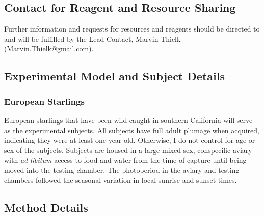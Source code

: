 \subsection{Contact for Reagent and Resource Sharing}
Further information and requests for resources and reagents should be directed to and will be fulfilled by the Lead Contact, Marvin Thielk (Marvin.Thielk@gmail.com).

\subsection{Experimental Model and Subject Details}
\subsubsection{European Starlings}
European starlings that have been wild-caught in southern California will serve as the experimental subjects. All subjects have full adult plumage when acquired, indicating they were at least one year old. Otherwise, I do not control for age or sex of the subjects. Subjects are housed in a large mixed sex, conspecific aviary with \textit{ad libitum} access to food and water from the time of capture until being moved into the testing chamber. The photoperiod in the aviary and testing chambers followed the seasonal variation in local sunrise and sunset times.

\subsection{Method Details}

